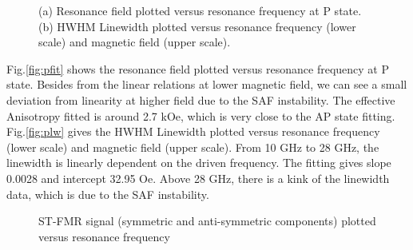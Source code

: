 \begin{figure}[!ht]
\centering
{}
\caption{(a) Resonance field plotted versus resonance frequency at P state. (b) HWHM Linewidth plotted versus resonance frequency (lower scale) and magnetic field (upper scale).}
\end{figure}

Fig.\ref{fig:pfit} shows the resonance field plotted versus resonance frequency at P state. Besides from the linear relations at lower magnetic field, we can see a small deviation from linearity at higher field  due to the SAF instability. The effective Anisotropy fitted is around 2.7 kOe, which is very close to the AP state fitting. Fig.\ref{fig:plw} gives the HWHM Linewidth plotted versus resonance frequency (lower scale) and magnetic field (upper scale). From 10 GHz to 28 GHz, the linewidth is linearly dependent on the driven frequency. The fitting gives slope 0.0028 and intercept 32.95 Oe. Above 28 GHz, there is a kink of the linewidth data, which is due to the SAF instability.


\begin{figure}[!ht]
\centering
{}
\caption{ST-FMR signal (symmetric and anti-symmetric components) plotted versus resonance frequency}
\end{figure}

